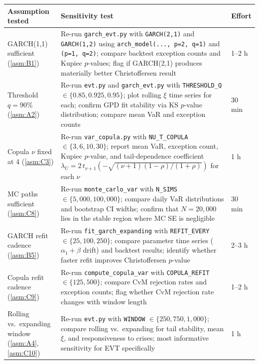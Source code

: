 \documentclass[11pt,a4paper]{article}
\newcommand{\code}[1]{\texttt{#1}}
\begin{document}
\medskip
\begin{tabularx}{\textwidth}{@{}p{3.8cm} X p{2.0cm}@{}}
\toprule
\textbf{Assumption tested} & \textbf{Sensitivity test} & \textbf{Effort} \\
\midrule

GARCH(1,1) sufficient (\cref{asm:B1}) &
Re-run \code{garch\_evt.py} with \code{GARCH(2,1)} and \code{GARCH(1,2)}
using \code{arch\_model(..., p=2, q=1)} and \code{(p=1, q=2)};
compare backtest exception counts and Kupiec $p$-values; flag if
GARCH(2,1) produces materially better Christoffersen result &
1--2 h \\[4pt]

Threshold $q = 90\%$ (\cref{asm:A2}) &
Re-run \code{evt.py} and \code{garch\_evt.py} with
\code{THRESHOLD\_Q} $\in \{0.85, 0.925, 0.95\}$;
plot rolling $\xi$ time series for each; confirm GPD fit stability
via KS $p$-value distribution; compare mean VaR and exception counts &
30 min \\[4pt]

Copula $\nu$ fixed at 4 (\cref{asm:C3}) &
Re-run \code{var\_copula.py} with \code{NU\_T\_COPULA}
$\in \{3, 6, 10, 30\}$; report mean VaR, exception count,
Kupiec $p$-value, and tail-dependence coefficient
$\lambda_U = 2\,t_{\nu+1}(-\sqrt{(\nu+1)(1-\rho)/(1+\rho)})$
for each $\nu$ &
1 h \\[4pt]

MC paths sufficient (\cref{asm:C8}) &
Re-run \code{monte\_carlo\_var} with \code{N\_SIMS}
$\in \{5{,}000, 100{,}000\}$; compare daily VaR distributions
and bootstrap CI widths; confirm that $N = 20{,}000$ lies in the
stable region where MC SE is negligible &
30 min \\[4pt]

GARCH refit cadence (\cref{asm:B5}) &
Re-run \code{fit\_garch\_expanding} with \code{REFIT\_EVERY}
$\in \{25, 100, 250\}$; compare parameter time series
($\alpha_1 + \beta$ drift) and backtest results;
identify whether faster refit improves Christoffersen $p$-value &
2--3 h \\[4pt]

Copula refit cadence (\cref{asm:C9}) &
Re-run \code{compute\_copula\_var} with \code{COPULA\_REFIT}
$\in \{125, 500\}$; compare CvM rejection rates and exception counts;
flag whether CvM rejection rate changes with window length &
1--2 h \\[4pt]

Rolling vs.\ expanding window (\cref{asm:A4}, \cref{asm:C10}) &
Re-run \code{evt.py} with \code{WINDOW}
$\in \{250, 750, 1{,}000\}$; compare rolling vs.\ expanding for
tail stability, mean $\xi$, and responsiveness to crises;
most informative sensitivity for EVT specifically &
1 h \\[4pt]


\end{tabularx}
\end{document}
